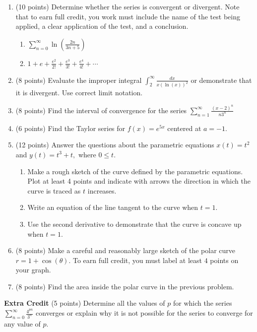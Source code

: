 \documentclass[12pt]{article}
\let\ds\displaystyle
\begin{document}
\begin{enumerate}
\begin{enumerate}
	\vfill
	\end{enumerate}
\newpage
\item (10 points) Determine whether the series is convergent or divergent. Note that to earn full credit, you work must include the name of the test being applied, a clear application of the test, and a conclusion. 
	\begin{enumerate}
	\item $\ds \sum_{n=0}^\infty \ln \left( \frac{2n}{3n+5}\right)$
	\vfill
	\item $\ds 1+e+\frac{e^2}{2!}+\frac{e^3}{3!}+\frac{e^4}{4!}+\cdots$
	\vfill
	\end{enumerate}
\newpage
\item (8 points) Evaluate the improper integral $\ds \int_2^\infty \frac{dx}{x (\ln(x))^2}$ or demonstrate that it is divergent. Use correct limit notation.
\vfill
\item (8 points) Find the interval of convergence for the series $\ds \sum_{n=1}^\infty \frac{(x-2)^n}{n3^n}$
\vfill
\vfill
\newpage
\item (6 points) Find the Taylor series for $f(x)=e^{5x}$ centered at $a=-1.$
\vfill
\newpage
\item (12 points) Answer the questions about the parametric equations $x(t)=t^2$ and $y(t)=t^3+t,$ where $0 \leq t.$
	\begin{enumerate}
	\item Make a rough sketch of the curve defined by the parametric equations. Plot at least 4 points and indicate with arrows the direction in which the curve is traced as $t$ increases.\\
	
\vfill

	\item Write an equation of the line tangent to the curve when $t=1.$
	\vfill
	\item Use the second derivative to demonstrate that the curve is concave up when $t=1.$
	\vfill
	\end{enumerate}
\newpage	
\item (8 points) Make a careful and reasonably large sketch of the polar curve $r=1+\cos(\theta).$ To earn full credit, you must label at least $4$ points on your graph.
\vfill
\item (8 points) Find the area inside the polar curve in the previous problem.
\vfill
\end{enumerate}
\newpage
\textbf{Extra Credit} (5 points) Determine all the values of $p$ for which the series $\ds \sum_{n=0}^\infty \frac{4^{pn}}{3^n}$ converges or explain why it is not possible for the series to converge for any value of $p.$
\end{document}

